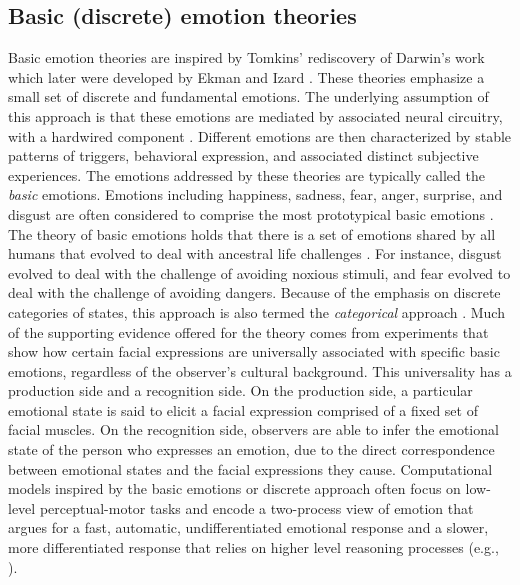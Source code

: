 \documentclass[11pt]{article}
\begin{document}
\subsection{Basic (discrete) emotion theories}
\label{sec:discrete-emotions}

Basic emotion theories are inspired by Tomkins' \cite{tomkins:affect}
rediscovery of Darwin's work
\cite{darwin:emotion-expression,hess:darwin-emotion} which later were developed
by Ekman \cite{ekman:argument-emotions} and Izard \cite{izard:human-emotions}.
These theories emphasize a small set of discrete and fundamental emotions.
The underlying assumption of this approach is that these emotions are mediated
by associated neural circuitry, with a hardwired component
\cite{ekman:argument-emotions}. Different emotions are then characterized by
stable patterns of triggers, behavioral expression, and associated distinct
subjective experiences. The emotions addressed by these theories are typically
called the \textit{basic} emotions. Emotions including happiness, sadness, fear,
anger, surprise, and disgust are often considered to comprise the most
prototypical basic emotions \cite{ekman:argument-emotions}. The theory of basic
emotions holds that there is a set of emotions shared by all humans that evolved
to deal with ancestral life challenges \cite{ekman:argument-emotions}. For
instance, disgust evolved to deal with the challenge of avoiding noxious
stimuli, and fear evolved to deal with the challenge of avoiding dangers.
Because of the emphasis on discrete categories of states, this approach is also
termed the \textit{categorical} approach \cite{panskepp:affective-neuroscience}.
Much of the supporting evidence offered for the theory comes from experiments
that show how certain facial expressions are universally associated with
specific basic emotions, regardless of the observer's cultural background. This
universality has a production side and a recognition side. On the production
side, a particular emotional state is said to elicit a facial expression
comprised of a fixed set of facial muscles. On the recognition side, observers
are able to infer the emotional state of the person who expresses an emotion,
due to the direct correspondence between emotional states and the facial
expressions they cause. Computational models inspired by the basic emotions or
discrete approach often focus on low-level perceptual-motor tasks and encode a
two-process view of emotion that argues for a fast, automatic, undifferentiated
emotional response and a slower, more differentiated response that relies on
higher level reasoning processes (e.g.,
\cite{armony:computational-modeling-emotion}).
\end{document}
